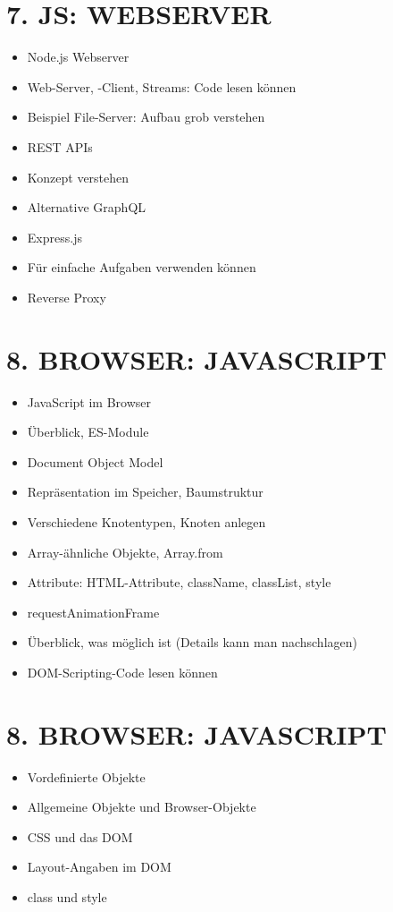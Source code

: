 \section*{7. JS: WEBSERVER}
\begin{itemize}
  \item Node.js Webserver
  \item Web-Server, -Client, Streams: Code lesen können
  \item Beispiel File-Server: Aufbau grob verstehen
  \item REST APIs
  \item Konzept verstehen
  \item Alternative GraphQL
  \item Express.js
  \item Für einfache Aufgaben verwenden können
  \item Reverse Proxy
\end{itemize}

\section*{8. BROWSER: JAVASCRIPT}
\begin{itemize}
  \item JavaScript im Browser
  \item Überblick, ES-Module
  \item Document Object Model
  \item Repräsentation im Speicher, Baumstruktur
  \item Verschiedene Knotentypen, Knoten anlegen
  \item Array-ähnliche Objekte, Array.from
  \item Attribute: HTML-Attribute, className, classList, style
  \item requestAnimationFrame
  \item Überblick, was möglich ist (Details kann man nachschlagen)
  \item DOM-Scripting-Code lesen können
\end{itemize}

\section*{8. BROWSER: JAVASCRIPT}
\begin{itemize}
  \item Vordefinierte Objekte
  \item Allgemeine Objekte und Browser-Objekte
  \item CSS und das DOM
  \item Layout-Angaben im DOM
  \item class und style
\end{itemize}

